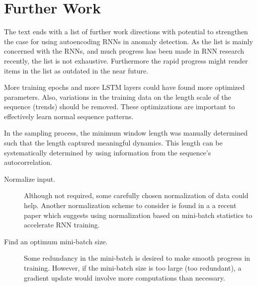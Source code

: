 \section{Further Work}

The text ends with a list of further work directions with potential to strengthen the case for using autoencoding RNNs in anomaly detection.
%
As the list is mainly concerned with the RNNs, and much progress has been made in RNN research recently, the list is not exhaustive.
%
Furthermore the rapid progress might render items in the list as outdated in the near future.


\begin{description}[style=unboxed]


\item[Better optimize presented work.]

More training epochs and more LSTM layers could have found more optimized parameters.
%
Also, variations in the training data on the length scale of the sequence (trends) should be removed.
%
These optimizations are important to effectively learn normal sequence patterns.


\item[Use autocorrelation to determine a minimum window width.]

In the sampling process, the minimum window length was manually determined such that the length captured meaningful dynamics.
%
This length can be systematically determined by using information from the sequence's autocorrelation.


\item[Accelerate training.]  \hfill %

                 \begin{description}


                 \item[Normalize input.]

                 Although not required, some carefully chosen normalization of data could help.
                 Another normalization scheme to consider is found in a a recent paper \cite{laurent2015batch} which suggests using normalization based on mini-batch statistics to accelerate RNN training.
                 

                 \item[Find an optimum mini-batch size.]
                 
                 Some redundancy in the mini-batch is desired to make smooth progress in training.
                 However, if the mini-batch size is too large (too redundant), a gradient update would involve more computations than necessary.
                          

\end{description}
\end{description}
